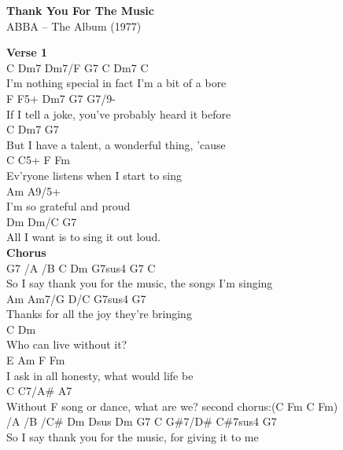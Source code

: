 \documentclass[a4paper]{article}
\begin{document}
    \begin{center}
        \textbf{Thank You For The Music}
        ~\\
        ABBA -- The Album (1977)
    \end{center}
    {
        \scriptsize
        \textbf{Verse 1}
        ~\\
        {
            \cutive
            \obeyspaces
C           Dm7      Dm7/F      G7          C  Dm7 C
\\
I'm nothing special in fact I'm a bit of a bore
\\
   F                     F5+                 Dm7  G7 G7/9-
\\
If I tell a joke, you've probably heard it before
\\
    C                  Dm7      G7
\\
But I have a talent, a wonderful thing, 'cause
\\
C        C5+          F          Fm
\\
Ev'ryone listens when I start to sing
\\
       Am               A9/5+
\\
I'm so grateful and proud
\\
      Dm        Dm/C       G7
\\
All I want is to sing it out loud.
\\

        }
        \textbf{Chorus}
        ~\\
        {
            \cutive
            \obeyspaces
G7 /A /B C                 Dm        G7sus4 G7  C
\\
So I   say thank you for the music, the songs  I'm singing
\\
Am        Am7/G  D/C        G7sus4 G7
\\
Thanks for all the joy they're bringing
\\
C                Dm
\\
Who can live without it? 
\\
  E     Am      F                   Fm
\\
I ask in all honesty, what would life be 
\\
          C       C7/A\#           A7
\\
Without F song or dance, what are we? second chorus:(C Fm   C      Fm)
\\
/A /B /C\# Dm       Dsus   Dm        G7          C G\#7/D\# C\#7sus4 G7
\\
So  I   say thank you for the music, for giving it to me
\\

}}
\end{document}
